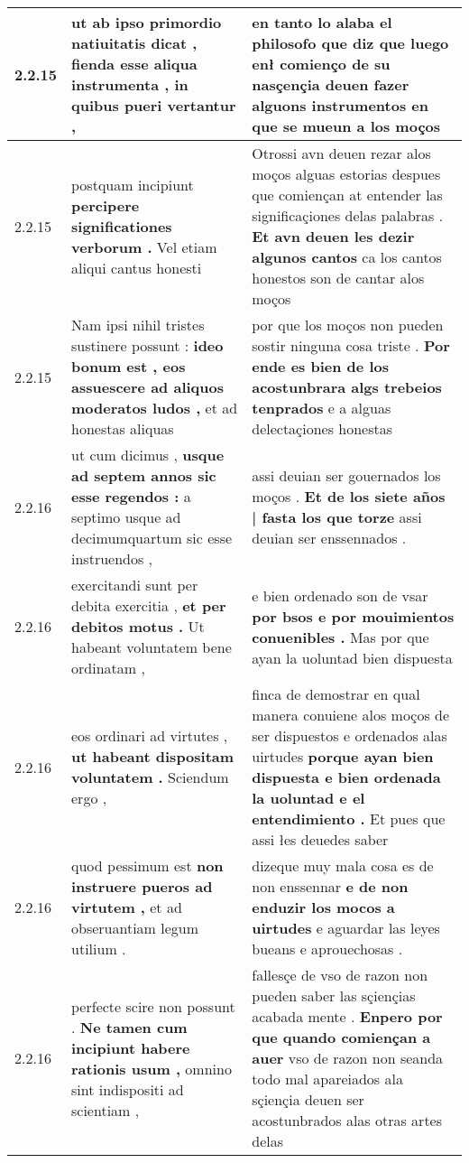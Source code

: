 \begin{tabular}{|p{1cm}|p{6.5cm}|p{6.5cm}|}
2.2.15 & ut ab ipso primordio natiuitatis dicat , \textbf{ fienda esse aliqua instrumenta , } in quibus pueri vertantur , & en tanto lo alaba el philosofo que diz que luego enł comienço de su nasçençia \textbf{ deuen fazer alguons instrumentos } en que se mueun a los moços \\\hline
2.2.15 & postquam incipiunt \textbf{ percipere significationes verborum . } Vel etiam aliqui cantus honesti & Otrossi avn deuen rezar alos moços alguas estorias despues que comiençan at entender las significaçiones delas palabras . \textbf{ Et avn deuen les dezir algunos cantos } ca los cantos honestos son de cantar alos moços \\\hline
2.2.15 & Nam ipsi nihil tristes sustinere possunt : \textbf{ ideo bonum est , eos assuescere ad aliquos moderatos ludos , } et ad honestas aliquas & por que los moços non pueden sostir ninguna cosa triste . \textbf{ Por ende es bien de los acostunbrara algs trebeios tenprados } e a alguas delectaçiones honestas \\\hline
2.2.16 & ut cum dicimus , \textbf{ usque ad septem annos sic esse regendos : } a septimo usque ad decimumquartum sic esse instruendos , & assi deuian ser gouernados los moços . \textbf{ Et de los siete años | fasta los que torze } assi deuian ser enssennados . \\\hline
2.2.16 & exercitandi sunt per debita exercitia , \textbf{ et per debitos motus . } Ut habeant voluntatem bene ordinatam , & e bien ordenado son de vsar \textbf{ por bsos e por mouimientos conuenibles . } Mas por que ayan la uoluntad bien dispuesta \\\hline
2.2.16 & eos ordinari ad virtutes , \textbf{ ut habeant dispositam voluntatem . } Sciendum ergo , & finca de demostrar en qual manera conuiene alos moços de ser dispuestos e ordenados alas uirtudes \textbf{ porque ayan bien dispuesta e bien ordenada la uoluntad e el entendimiento . } Et pues que assi łes deuedes saber \\\hline
2.2.16 & quod pessimum est \textbf{ non instruere pueros ad virtutem , } et ad obseruantiam legum utilium . & dizeque muy mala cosa es de non enssennar \textbf{ e de non enduzir los mocos a uirtudes } e aguardar las leyes bueans e aprouechosas . \\\hline
2.2.16 & perfecte scire non possunt . \textbf{ Ne tamen cum incipiunt habere rationis usum , } omnino sint indispositi ad scientiam , & fallesçe de vso de razon non pueden saber las sçiençias acabada mente . \textbf{ Enpero por que quando comiençan a auer } vso de razon non seanda todo mal apareiados ala sçiençia deuen ser acostunbrados alas otras artes delas \\\hline

\end{tabular}
